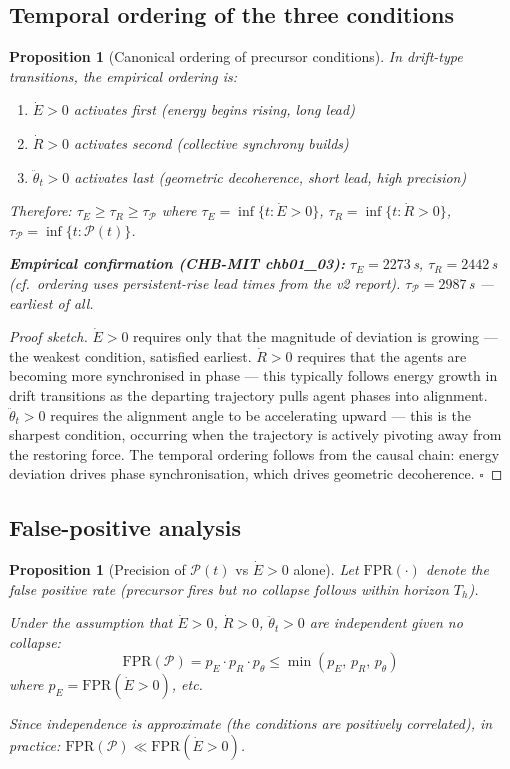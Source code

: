 \documentclass[11pt,a4paper]{article}
\newtheorem{proposition}[theorem]{Proposition}
\theoremstyle{definition}
\begin{document}
\subsection{Temporal ordering of the three conditions}

\begin{proposition}[Canonical ordering of precursor conditions]
\label{prop:precursor_ordering}
In drift-type transitions, the empirical ordering is:
\begin{enumerate}
\item $\dot E > 0$ activates first (energy begins rising, long lead)
\item $\dot R > 0$ activates second (collective synchrony builds)
\item $\ddot\theta_t > 0$ activates last (geometric decoherence, short lead, high precision)
\end{enumerate}
Therefore:
$\tau_E \geq \tau_R \geq \tau_\mathcal{P}$
where $\tau_E = \inf\{t: \dot E > 0\}$,
$\tau_R = \inf\{t: \dot R > 0\}$,
$\tau_\mathcal{P} = \inf\{t: \mathcal{P}(t)\}$.

\textbf{Empirical confirmation (CHB-MIT chb01\_03):}
$\tau_E = 2273$\,s, $\tau_R = 2442$\,s (\emph{cf.}~ordering uses
persistent-rise lead times from the v2 report).
$\tau_\mathcal{P} = 2987$\,s --- earliest of all.
\end{proposition}

\begin{proof}[Proof sketch]
$\dot E > 0$ requires only that the magnitude of deviation is
growing --- the weakest condition, satisfied earliest.
$\dot R > 0$ requires that the agents are becoming more synchronised
in phase --- this typically follows energy growth in drift transitions
as the departing trajectory pulls agent phases into alignment.
$\ddot\theta_t > 0$ requires the alignment angle to be accelerating
upward --- this is the sharpest condition, occurring when
the trajectory is actively pivoting away from the restoring force.
The temporal ordering follows from the causal chain:
energy deviation drives phase synchronisation, which drives
geometric decoherence. $\square$
\end{proof}

\subsection{False-positive analysis}

\begin{proposition}[Precision of $\mathcal{P}(t)$ vs $\dot E > 0$ alone]
\label{prop:precision}
Let $\mathrm{FPR}(\cdot)$ denote the false positive rate
(precursor fires but no collapse follows within horizon $T_h$).

Under the assumption that $\dot E > 0$, $\dot R > 0$, $\ddot\theta_t > 0$
are independent given no collapse:
\[
\mathrm{FPR}(\mathcal{P}) = p_E \cdot p_R \cdot p_\theta
\leq \min(p_E,\, p_R,\, p_\theta)
\]
where $p_E = \mathrm{FPR}(\dot E > 0)$, etc.

Since independence is approximate (the conditions are positively
correlated), in practice:
$\mathrm{FPR}(\mathcal{P}) \ll \mathrm{FPR}(\dot E > 0)$.
\end{proposition}
\end{document}
